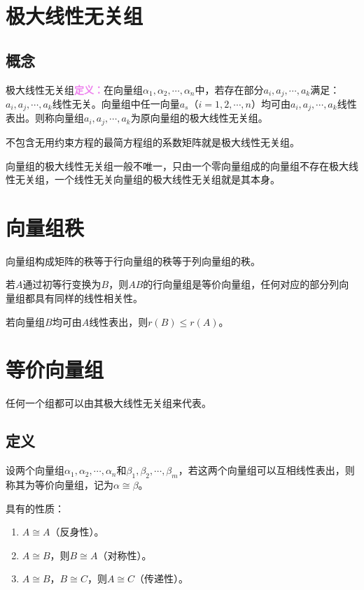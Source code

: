 \documentclass[UTF8, 12pt]{ctexart}
\begin{document}
\section{极大线性无关组}

\subsection{概念}

极大线性无关组\textcolor{violet}{\textbf{定义：}}在向量组$\alpha_1,\alpha_2,\cdots,\alpha_n$中，若存在部分$a_i,a_j,\cdots,a_k$满足：$a_i,a_j,\cdots,a_k$线性无关。向量组中任一向量$a_s$（$i=1,2,\cdots,n$）均可由$a_i,a_j,\cdots,a_k$线性表出。则称向量组$a_i,a_j,\cdots,a_k$为原向量组的极大线性无关组。

不包含无用约束方程的最简方程组的系数矩阵就是极大线性无关组。

向量组的极大线性无关组一般不唯一，只由一个零向量组成的向量组不存在极大线性无关组，一个线性无关向量组的极大线性无关组就是其本身。

\section{向量组秩}

向量组构成矩阵的秩等于行向量组的秩等于列向量组的秩。

若$A$通过初等行变换为$B$，则$AB$的行向量组是等价向量组，任何对应的部分列向量组都具有同样的线性相关性。

若向量组$B$均可由$A$线性表出，则$r(B)\leqslant r(A)$。

\section{等价向量组}

任何一个组都可以由其极大线性无关组来代表。

\subsection{定义}

设两个向量组$\alpha_1,\alpha_2,\cdots,\alpha_n$和$\beta_1,\beta_2,\cdots,\beta_m$，若这两个向量组可以互相线性表出，则称其为等价向量组，记为$\alpha\cong\beta$。

具有的性质：

\begin{enumerate}
    \item $A\cong A$（反身性）。
    \item $A\cong B$，则$B\cong A$（对称性）。
    \item $A\cong B$，$B\cong C$，则$A\cong C$（传递性）。
\end{enumerate}
\end{document}
